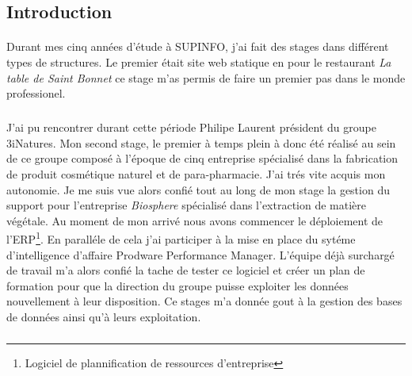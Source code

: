 \documentclass[11pt, a4paper ]{article}
\let\stdsection\section
\renewcommand\section{\newpage\stdsection}
\begin{document}
\begin{spacing}{1.5}
	\section{Introduction} %

\paragraph{}
Durant mes cinq années d'étude à SUPINFO, j'ai fait des stages dans différent types de structures. Le premier était site web statique en pour le restaurant \emph{La table de Saint Bonnet} ce stage m'as permis de faire un premier pas dans le monde professionel. 
\subparagraph{}
J'ai pu rencontrer durant cette période Philipe Laurent président du groupe 3iNatures. Mon second stage, le premier à temps plein à donc été réalisé au sein de ce groupe composé à l'époque de cinq entreprise spécialisé dans la fabrication de produit cosmétique naturel et de para-pharmacie. J'ai trés vite acquis mon autonomie. Je me suis vue alors confié tout au long de mon stage la gestion du support pour l'entreprise \emph{Biosphere} spécialisé dans l'extraction de matière végétale. Au moment de mon arrivé nous avons commencer le déploiement de l'ERP\footnote{Logiciel de plannification de ressources d'entreprise}. En paralléle de cela j'ai participer à la mise en place du sytéme d'intelligence d'affaire Prodware Performance Manager. L'équipe déjà surchargé de travail m'a alors confié la tache de tester ce logiciel et créer un plan de formation pour que la direction du groupe puisse exploiter les données nouvellement à leur disposition. Ce stages m'a donnée gout à la gestion des bases de données ainsi qu'à leurs exploitation.
\subparagraph{}

\end{spacing}
\end{document}
